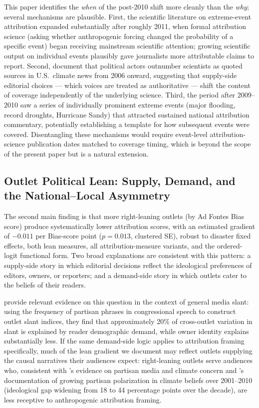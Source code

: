 \documentclass[12pt]{article}
\begin{document}
This paper identifies the \emph{when} of the post-2010 shift more
cleanly than the \emph{why}; several mechanisms are plausible.
First, the scientific literature on extreme-event attribution expanded
substantially after roughly 2011, when formal attribution science
(asking whether anthropogenic forcing changed the probability of a
specific event) began receiving mainstream scientific attention; growing
scientific output on individual events plausibly gave journalists more
attributable claims to report.  Second, \citet{chinn2020} document that
political actors outnumber scientists as quoted sources in U.S.\ climate
news from 2006 onward, suggesting that supply-side editorial choices ---
which voices are treated as authoritative --- shift the content of
coverage independently of the underlying science.  Third, the period
after 2009--2010 saw a series of individually prominent extreme events
(major flooding, record droughts, Hurricane Sandy) that attracted
sustained national attribution commentary, potentially establishing a
template for how subsequent events were covered.  Disentangling these
mechanisms would require event-level attribution-science publication
dates matched to coverage timing, which is beyond the scope of the
present paper but is a natural extension.

\subsection*{Outlet Political Lean: Supply, Demand, and the
National--Local Asymmetry}

The second main finding is that more right-leaning outlets (by Ad
Fontes Bias score) produce systematically lower attribution scores,
with an estimated gradient of $-0.011$ per Bias-score point
($p=0.013$, clustered SE), robust to disaster fixed effects, both lean
measures, all attribution-measure variants, and the ordered-logit
functional form.  Two broad explanations are consistent with this
pattern: a supply-side story in which editorial decisions reflect the
ideological preferences of editors, owners, or reporters; and a
demand-side story in which outlets cater to the beliefs of their
readers.

\citet{gentzkow2010} provide relevant evidence on this question in the
context of general media slant: using the frequency of partisan phrases
in congressional speech to construct outlet slant indices, they find
that approximately 20\% of cross-outlet variation in slant is explained
by reader demographic demand, while owner identity explains
substantially less.  If the same demand-side logic applies to
attribution framing specifically, much of the lean gradient we document
may reflect outlets supplying the causal narratives their audiences
expect: right-leaning outlets serve audiences who, consistent with
\citet{carmichael2017}'s evidence on partisan media and climate concern
and \citet{mccright2011}'s documentation of growing partisan
polarization in climate beliefs over 2001--2010 (ideological gap
widening from 18 to 44 percentage points over the decade), are less
receptive to anthropogenic attribution framing.
\end{document}
